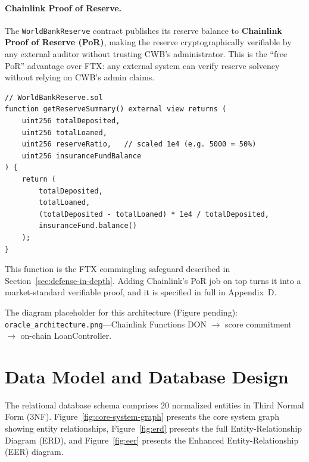 \documentclass[12pt,a4paper]{report}
\begin{document}
\paragraph{Chainlink Proof of Reserve.}
The \texttt{WorldBankReserve} contract publishes its reserve balance to \textbf{Chainlink Proof of Reserve (PoR)}, making the reserve cryptographically verifiable by any external auditor without trusting CWB's administrator. This is the ``free PoR'' advantage over FTX: any external system can verify reserve solvency without relying on CWB's admin claims.

\begin{verbatim}
// WorldBankReserve.sol
function getReserveSummary() external view returns (
    uint256 totalDeposited,
    uint256 totalLoaned,
    uint256 reserveRatio,   // scaled 1e4 (e.g. 5000 = 50%)
    uint256 insuranceFundBalance
) {
    return (
        totalDeposited,
        totalLoaned,
        (totalDeposited - totalLoaned) * 1e4 / totalDeposited,
        insuranceFund.balance()
    );
}
\end{verbatim}

This function is the FTX commingling safeguard described in Section~\ref{sec:defense-in-depth}. Adding Chainlink's PoR job on top turns it into a market-standard verifiable proof, and it is specified in full in Appendix~D.

The diagram placeholder for this architecture (Figure pending): \texttt{oracle\_architecture.png}---Chainlink Functions DON $\to$ score commitment $\to$ on-chain LoanController.


\section{Data Model and Database Design}

The relational database schema comprises 20 normalized entities in Third Normal Form (3NF). Figure~\ref{fig:core-system-graph} presents the core system graph showing entity relationships, Figure~\ref{fig:erd} presents the full Entity-Relationship Diagram (ERD), and Figure~\ref{fig:eer} presents the Enhanced Entity-Relationship (EER) diagram.
\end{document}

